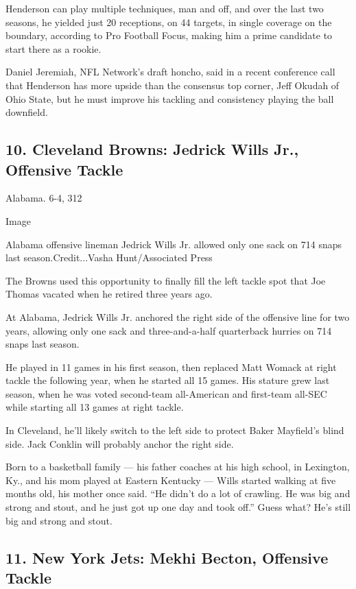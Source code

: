 Henderson can play multiple techniques, man and off, and over the last
two seasons, he yielded just 20 receptions, on 44 targets, in single
coverage on the boundary, according to Pro Football Focus, making him a
prime candidate to start there as a rookie.

Daniel Jeremiah, NFL Network's draft honcho, said in a recent conference
call that Henderson has more upside than the consensus top corner, Jeff
Okudah of Ohio State, but he must improve his tackling and consistency
playing the ball downfield.

\hypertarget{10-cleveland-browns-jedrick-wills-jr-offensive-tackle}{%
\subsection{10. Cleveland Browns: Jedrick Wills Jr., Offensive
Tackle}\label{10-cleveland-browns-jedrick-wills-jr-offensive-tackle}}

Alabama. 6-4, 312

Image

Alabama offensive lineman Jedrick Wills Jr. allowed only one sack on 714
snaps last season.Credit...Vasha Hunt/Associated Press

The Browns used this opportunity to finally fill the left tackle spot
that Joe Thomas vacated when he retired three years ago.

At Alabama, Jedrick Wills Jr. anchored the right side of the offensive
line for two years, allowing only one sack and three-and-a-half
quarterback hurries on 714 snaps last season.

He played in 11 games in his first season, then replaced Matt Womack at
right tackle the following year, when he started all 15 games. His
stature grew last season, when he was voted second-team all-American and
first-team all-SEC while starting all 13 games at right tackle.

In Cleveland, he'll likely switch to the left side to protect Baker
Mayfield's blind side. Jack Conklin will probably anchor the right side.

Born to a basketball family --- his father coaches at his high school,
in Lexington, Ky., and his mom played at Eastern Kentucky --- Wills
started walking at five months old, his mother once said. ``He didn't do
a lot of crawling. He was big and strong and stout, and he just got up
one day and took off.'' Guess what? He's still big and strong and stout.

\hypertarget{11-new-york-jets-mekhi-becton-offensive-tackle}{%
\subsection{11. New York Jets: Mekhi Becton, Offensive
Tackle}\label{11-new-york-jets-mekhi-becton-offensive-tackle}}

